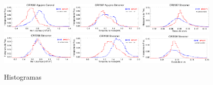 \documentclass[baaa]{baaa}
\begin{document}
\begin{figure}
  \centering
  \includegraphics[width=0.32\textwidth]{figuras/proceeding_2082_demt_awsom_streamer_ne_1055.eps}
  \includegraphics[width=0.32\textwidth]{figuras/proceeding_2082_demt_awsom_streamer_Tm.eps}
  \includegraphics[width=0.32\textwidth]{figuras/proceeding_2082_demt_awsom_streamer_lambda_n.eps}\\
   \includegraphics[width=0.32\textwidth]{figuras/proceeding_2208_demt_awsom_streamer_ne_1055.eps}
  \includegraphics[width=0.32\textwidth]{figuras/proceeding_2208_demt_awsom_streamer_Tm.eps}
  \includegraphics[width=0.32\textwidth]{figuras/proceeding_2208_demt_awsom_streamer_lambda_n.eps}
  \caption{Histogramas}
  \label{fig-histos}
\end{figure}

\end{document}

